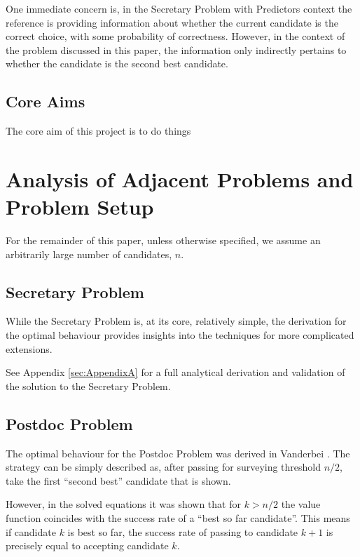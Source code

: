 \documentclass[a4paper,11pt]{article}
\begin{document}
One immediate concern is, in the Secretary Problem with Predictors context the reference is providing information about whether the current candidate is the correct choice, with some probability of correctness. However, in the context of the problem discussed in this paper, the information only indirectly pertains to whether the candidate is the second best candidate.

\subsection{Core Aims}

The core aim of this project is to do things

\section{Analysis of Adjacent Problems and Problem Setup}
\label{sec:synthesis}

For the remainder of this paper, unless otherwise specified, we assume an arbitrarily large number of candidates, $n$.

\subsection{Secretary Problem}

While the Secretary Problem is, at its core, relatively simple, the derivation for the optimal behaviour provides insights into the techniques for more complicated extensions.

See Appendix \ref{sec:AppendixA} for a full analytical derivation and validation of the solution to the Secretary Problem.

\subsection{Postdoc Problem}

The optimal behaviour for the Postdoc Problem was derived in Vanderbei \cite{vanderbei2011postdoc}. The strategy can be simply described as, after passing for surveying threshold $n/2$, take the first ``second best'' candidate that is shown.

However, in the solved equations it was shown that for $k > n/2$ the value function coincides with the success rate of a ``best so far candidate''. This means if candidate $k$ is best so far, the success rate of passing to candidate $k+1$ is precisely equal to accepting candidate $k$.
\end{document}
